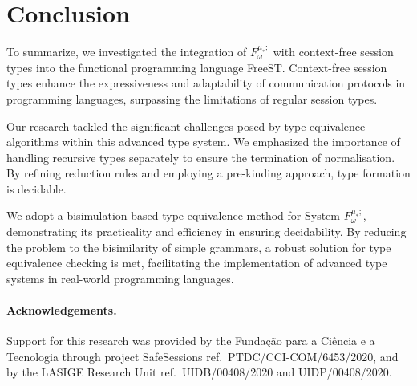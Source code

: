 \section{Conclusion}\label{sec:conclusion}
To summarize, we investigated the integration of  $F^{\mu_*;}_\omega$ with context-free session types into the functional programming language FreeST. Context-free session types enhance the expressiveness and adaptability of communication protocols in programming languages, surpassing the limitations of regular session types. 

Our research tackled the significant challenges posed by type equivalence algorithms within this advanced type system. We emphasized the importance of handling recursive types separately to ensure the termination of normalisation. By refining reduction rules and employing a pre-kinding approach, type formation is decidable.

We adopt a bisimulation-based type equivalence method for System $F^{\mu_*;}_\omega$, demonstrating its practicality and efficiency in ensuring decidability. By reducing the problem to the bisimilarity of simple grammars, a robust solution for type equivalence checking is met, facilitating the implementation of advanced type systems in real-world programming languages.
\medskip

\paragraph{Acknowledgements.}
  Support for this research was provided by the Fundação para a Ciência e a
  Tecnologia through project SafeSessions ref.\ PTDC/CCI-COM/6453/2020, and by the
  LASIGE Research Unit ref.\ UIDB/00408/2020
  and UIDP/00408/2020.

